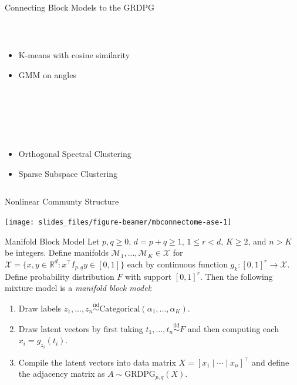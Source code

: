 \documentclass[
  ignorenonframetext,
]{beamer}
\providecommand{\tightlist}{%
  \setlength{\itemsep}{0pt}\setlength{\parskip}{0pt}}
\begin{document}
\begin{frame}{Connecting Block Models to the GRDPG}
\begin{columns}[T]
\begin{column}{0.33\textwidth}
~

\begin{itemize}
\tightlist
\item
  K-means with cosine similarity
\item
  GMM on angles
\end{itemize}

~

~

~

\begin{itemize}
\tightlist
\item
  Orthogonal Spectral Clustering
\item
  Sparse Subspace Clustering
\end{itemize}
\end{column}
\end{columns}
\end{frame}

\begin{frame}{Nonlinear Communty Structure}
\protect\hypertarget{nonlinear-communty-structure}{}
\begin{center}\texttt{[image: slides\_files/figure-beamer/mbconnectome-ase-1]} \end{center}
\end{frame}

\begin{frame}{Manifold Block Model}
\protect\hypertarget{manifold-block-model}{}
Let \(p, q \geq 0\), \(d = p + q \geq 1\), \(1 \leq r < d\),
\(K \geq 2\), and \(n > K\) be integers. Define manifolds
\(\mathcal{M}_1, ..., \mathcal{M}_K \in \mathcal{X}\) for
\(\mathcal{X} = \{x, y \in \mathbb{R}^d : x^\top I_{p,q} y \in [0, 1]\}\)
each by continuous function \(g_k : [0, 1]^r \to \mathcal{X}\). Define
probability distribution \(F\) with support \([0, 1]^r\). Then the
following mixture model is a \emph{manifold block model}:

\begin{enumerate}
\item Draw labels $z_1, ..., z_n \stackrel{\text{iid}}{\sim}\text{Categorical}(\alpha_1, ..., \alpha_K)$.
\item Draw latent vectors by first taking $t_1,..., t_n \stackrel{\text{iid}}{\sim}F$ and then computing each $x_i = g_{z_i}(t_i)$. 
\item Compile the latent vectors into data matrix $X = [ x_1 \mid \cdots \mid x_n ]^\top$ and define the adjacency matrix as $A \sim \text{GRDPG}_{p,q}(X)$. 
\end{enumerate}
\end{frame}
\end{document}
